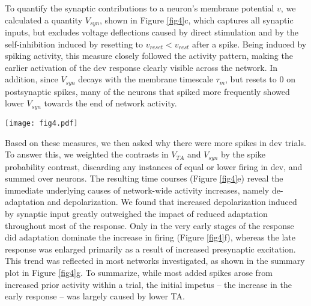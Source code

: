 \documentclass[pdflatex,referee,iicol,sn-basic]{sn-jnl}
\theoremstyle{thmstyleone}%
\theoremstyle{thmstyletwo}%
\theoremstyle{thmstylethree}%
\begin{document}
To quantify the synaptic contributions to a neuron's membrane potential $v$, we calculated a quantity $V_{syn}$, shown in Figure \ref{fig4}c, which captures all synaptic inputs, but excludes voltage deflections caused by direct stimulation and by the self-inhibition induced by resetting to $v_{reset} < v_{rest}$ after a spike. Being induced by spiking activity, this measure closely followed the activity pattern, making the earlier activation of the dev response clearly visible across the network. In addition, since $V_{syn}$ decays with the membrane timescale $\tau_m$, but resets to $0$ on postsynaptic spikes, many of the neurons that spiked more frequently showed lower $V_{syn}$ towards the end of network activity.

\begin{figure*}%
    \centering
    \texttt{[image: fig4.pdf]}
    \caption{Responses and threshold adaptation in a TA-only ablation. \textbf{a, b, c} Post-stimulus histograms across target trials, showing trial time along the horizontal axis, and neurons along the vertical, sorted by the time of the first recorded spike across all trials and conditions. Left and middle column, target trials in dev and msc sequence, respectively; right column, contrast between these two. \textbf{d} Per-neuron relationship between the contrast (dev - msc) in $V_{TA}$ at the start of trials, and the contrast in average number of spikes fired, excluding inhibitory neurons, and associated linear regression (r = -0.424, p = 3.1e-36). \textbf{e} Contribution of $V_{TA}$ and $V_{syn}$ to bins with increased firing in dev (i.e., red bins in the spike probability contrast, \textbf{a}), weighted by that same contrast. \textbf{f} Contribution of $V_{TA}$ relative to the sum of the weighted contributions in \textbf{e}. \textbf{g} Relative contribution of $V_{TA}$ across networks, showing median (solid line) and inter-quartile range (shaded area)}
    \label{fig4}
\end{figure*}

Based on these measures, we then asked why there were more spikes in dev trials. To answer this, we weighted the contrasts in $V_{TA}$ and $V_{syn}$ by the spike probability contrast, discarding any instances of equal or lower firing in dev, and summed over neurons. The resulting time courses (Figure \ref{fig4}e) reveal the immediate underlying causes of network-wide activity increases, namely de-adaptation and depolarization. We found that increased depolarization induced by synaptic input greatly outweighed the impact of reduced adaptation throughout most of the response. Only in the very early stages of the response did adaptation dominate the increase in firing (Figure \ref{fig4}f), whereas the late response was enlarged primarily as a result of increased presynaptic excitation. This trend was reflected in most networks investigated, as shown in the summary plot in Figure \ref{fig4}g. To summarize, while most added spikes arose from increased prior activity within a trial, the initial impetus -- the increase in the early response -- was largely caused by lower TA.
\end{document}
